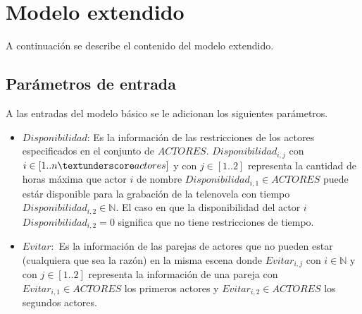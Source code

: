 \documentclass{article}
\begin{document}
\section{Modelo extendido}
A continuación se describe el contenido del modelo extendido. \newline

\subsection{Parámetros de entrada}
A las entradas del modelo básico se le adicionan los siguientes parámetros.
\begin{itemize}
    \item $Disponibilidad$: Es la información de las restricciones de los actores especificados en el conjunto de $ACTORES$. $Disponibilidad_{i,j}$ con $i \in [1..n\textunderscore actores]$ y con $j \in [1..2]$ representa la cantidad de horas máxima que actor $i$ de nombre $Disponibilidad_{i,1} \in ACTORES$ puede estár disponible para la grabación de la telenovela con tiempo $Disponibilidad_{i,2} \in \mathbb{N} $. El caso en que la disponibilidad del actor $i$  $Disponibilidad_{i,2} = 0$ significa que no tiene restricciones de tiempo.
    \item $Evitar:$ Es la información de las parejas de actores que no 
    pueden estar (cualquiera que sea la razón) en la misma escena donde $Evitar_{i,j}$ con $i \in \mathbb{N}$ y con $j \in [1..2]$ representa la información de una pareja con $Evitar_{i,1} \in ACTORES$ los primeros actores y $Evitar_{i,2} \in ACTORES$ los segundos actores.
\end{itemize}
\end{document}
